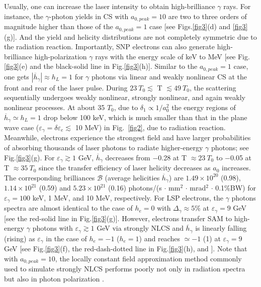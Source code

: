 \documentclass[10pt,twocolumn,showpacs,amsmath,amssymb,floatfix,superscriptaddress]{revtex4-2}
\begin{document}
Usually, one can increase the laser intensity to obtain high-brilliance $\gamma$ rays. For instance, the $\gamma$-photon yields in CS with  $a_{0,peak}=10$ are two to three orders of magnitude higher than those of the $a_{0,peak}=1$ case [see Figs.\ref{fig3}(d) and \ref{fig3}(g)]. And the yield and helicity distributions are not completely symmetric due to the radiation reaction. Importantly, SNP electrons can also generate high-brilliance high-polarization $\gamma$ rays with the energy scale of keV to MeV [see Fig.\ref{fig3}(e) and the black-solid line in Fig.\ref{fig3}(h)]. Similar to the $a_{0,peak}=1$ case, one gets $\left|\overline{h}_\gamma\right| \approx h_L =1$ for $\gamma$ photons via linear and weakly nonlinear CS at the front and rear of the laser pulse. During $23~T_0 \lesssim $ T $\lesssim 49~T_0$, the scattering sequentially undergoes weakly nonlinear, strongly nonlinear, and again weakly nonlinear processes. At about 35 $T_0$, due to $\delta_1 \propto 1/a_0^2$ the energy regions of $\overline{h}_\gamma \simeq h_L= 1$ drop below 100 keV, which is much smaller than that in the plane wave case ($\varepsilon_\gamma = \delta \varepsilon_e \lesssim$ 10 MeV) in Fig.~\ref{fig2}, due to radiation reaction. Meanwhile, electrons experience the strongest field and have larger probabilities of absorbing thousands of laser photons to radiate higher-energy $\gamma$ photons; see Fig.\ref{fig3}(g). For $\varepsilon_\gamma \gtrsim 1$ GeV, $\overline{h}_\gamma$ decreases from $-$0.28 at T $\approx 23~T_0$ to $-$0.05 at T $\approx 35~T_0$ since the transfer efficiency of laser helicity decreases as $a_0$ increases. The corresponding brilliances $\mathcal{B}$ (average helicities $\overline{h}_\gamma$) are $1.49 \times 10^{20}$ (0.98), $1.14 \times 10^{21}$ (0.59) and $5.23 \times 10^{21}$ (0.16) photons/(s $\cdot$ mm$^2$ $\cdot$ mrad$^2$ $\cdot$ 0.1\%BW) for $\varepsilon_\gamma=100$ keV, 1 MeV, and 10 MeV, respectively. For LSP electrons, the $\gamma$ photons spectra are almost identical to the case of $h_e=0$ with $\Delta_{\gamma} \approx 5\%$ at $\varepsilon_\gamma=9$ GeV [see the red-solid line in Fig.\ref{fig3}(g)]. However, electrons transfer SAM to high-energy $\gamma$ photons with $\varepsilon_{\gamma} \gtrsim 1$ GeV via strongly NLCS and $\overline{h}_\gamma$ is linearly falling (rising) as $\varepsilon_{\gamma}$ in the case of $h_e=-1$ ($h_e=1$) and reaches $\simeq -1$ (1) at $\varepsilon_{\gamma}=9$ GeV [see Fig.\ref{fig3}(f), the red-dash-dotted line in Fig.\ref{fig3}(h), and \cite{Supplemental}]. Note that with $a_{0,peak}=10$, the locally constant field approximation method commonly used to simulate strongly NLCS performs poorly not only in radiation spectra but also in photon polarization \cite{Ritus1985,Baier1989,Harvey2015,Dinu2016,Piazza2018,Piazza2019,Ilderton2019a,Ilderton2019b,Heinzl2020,Blackburn2021,Supplemental}.
\end{document}
